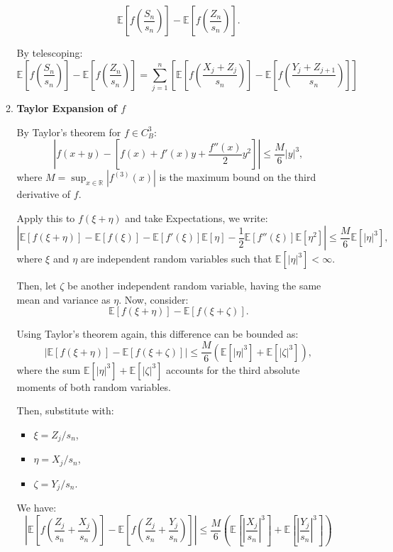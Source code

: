 \begin{itemize}
\begin{enumerate}
\[
\mathbb{E}\left[f\left(\frac{S_n}{s_n}\right)\right] - \mathbb{E}\left[f\left(\frac{Z_n}{s_n}\right)\right].
\]

By telescoping:
\[
\mathbb{E}\left[f\left(\frac{S_n}{s_n}\right)\right] - \mathbb{E}\left[f\left(\frac{Z_n}{s_n}\right)\right] = \sum_{j=1}^n \left[\mathbb{E}\left[f\left(\frac{X_j + Z_j}{s_n}\right)\right] - \mathbb{E}\left[f\left(\frac{Y_j + Z_{j+1}}{s_n}\right)\right]\right]
\]

\item \textbf{Taylor Expansion of \( f \)}

By Taylor's theorem for \( f \in C^3_B \):
\[
\left|f(x + y) - \left[f(x) + f'(x)y + \frac{f''(x)}{2}y^2\right]\right| \leq \frac{M}{6}|y|^3,
\]
where \( M = \sup_{x \in \mathbb{R}} |f^{(3)}(x)| \) is the maximum bound on the third derivative of \( f \).

Apply this to \( f(\xi + \eta) \) and take Expectations, we write:
\[
\left| \mathbb{E}[f(\xi + \eta)] - \mathbb{E}[f(\xi)] - \mathbb{E}[f'(\xi)]\mathbb{E}[\eta] - \frac{1}{2}\mathbb{E}[f''(\xi)]\mathbb{E}[\eta^2] \right| \leq \frac{M}{6} \mathbb{E}[|\eta|^3],
\]
where \( \xi \) and \( \eta \) are independent random variables such that \(\mathbb{E}[|\eta|^3] < \infty \).

Then, let \( \zeta \) be another independent random variable, having the same mean and variance as \( \eta \). Now, consider:
     \[
     \mathbb{E}[f(\xi + \eta)] - \mathbb{E}[f(\xi + \zeta)].
     \]
     
Using Taylor's theorem again, this difference can be bounded as:
     \[
     \left| \mathbb{E}[f(\xi + \eta)] - \mathbb{E}[f(\xi + \zeta)] \right| \leq \frac{M}{6} (\mathbb{E}[|\eta|^3] + \mathbb{E}[|\zeta|^3]),
     \]
     where the sum \( \mathbb{E}[|\eta|^3] + \mathbb{E}[|\zeta|^3] \) accounts for the third absolute moments of both random variables.

Then, substitute with:
\begin{itemize}
    \item \( \xi = Z_j / s_n \),
    \item \( \eta = X_j / s_n \),
    \item \( \zeta = Y_j / s_n \).
\end{itemize}
We have:
   \begin{equation} \label{eq:1}
       \left| \mathbb{E}\left[f\left(\frac{Z_j}{s_n} + \frac{X_j}{s_n}\right)\right] - \mathbb{E}\left[f\left(\frac{Z_j}{s_n} + \frac{Y_j}{s_n}\right)\right] \right| \leq \frac{M}{6} \left( \mathbb{E}\left[\left| \frac{X_j}{s_n} \right|^3\right] + \mathbb{E}\left[\left| \frac{Y_j}{s_n} \right|^3\right] \right)
   \end{equation}
   

\end{enumerate}
\end{itemize}
